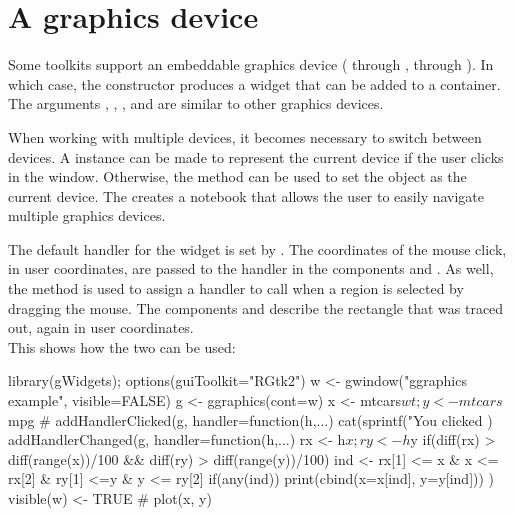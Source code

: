 \section{A graphics device}
\label{sec:gWidgets-graphics-device}

Some toolkits support an embeddable graphics device (
through ,  through ). In which case, the 
constructor produces a widget that can be added to a container. The
arguments , ,
, and  are similar to
other graphics devices.

When working with multiple devices, it becomes necessary to switch
between devices. A  instance can be made to represent
the current device if the user clicks in the window. Otherwise, the
 method can be used to set the
object as the current device.  The 
creates a notebook that allows the user to easily navigate multiple
graphics devices.




The default handler for the widget is set by
. The coordinates of the mouse
click, in user coordinates, are passed to the handler in the
components  and . As well, the method
 is used to assign a handler to
call when a region is selected by dragging the mouse. The components
 and  describe the rectangle that was traced out,
again in user coordinates.
\\

This shows how the two can be used:
\begin{Schunk}
\begin{Sinput}
 library(gWidgets); options(guiToolkit="RGtk2")
 w <- gwindow("ggraphics example", visible=FALSE)
 g <- ggraphics(cont=w)
 x <- mtcars$wt; y <- mtcars$mpg
 #
 addHandlerClicked(g, handler=function(h,...) {
   cat(sprintf("You clicked %
 })
 addHandlerChanged(g, handler=function(h,...) {
   rx <- h$x; ry <- h$y
   if(diff(rx) > diff(range(x))/100 && 
      diff(ry) > diff(range(y))/100) {
     ind <- rx[1] <= x & x <= rx[2] & ry[1] <=y & y <= ry[2]
     if(any(ind))
       print(cbind(x=x[ind], y=y[ind]))
   }
 })
 visible(w) <- TRUE
 #
 plot(x, y)
\end{Sinput}
\end{Schunk}
%




